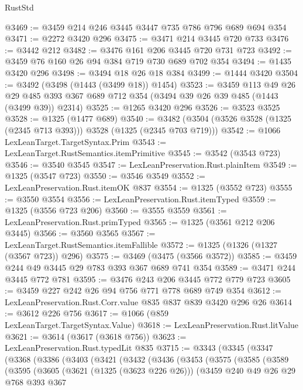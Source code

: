 \begin{lexlean}{RustStd}
\begin{coremodule}
@3469 := @3459 @214 @246 @3445 @3447 @735 @786 @796 @689 @694 @354
@3471 := @2272 @3420 @296
@3475 := @3471 @214 @3445 @720 @733
@3476 := @3442 @212
@3482 := @3476 @161 @206 @3445 @720 @731 @723
@3492 := @3459 @76 @160 @26 @94 @384 @719 @730 @689 @702 @354
@3494 := @1435 @3420 @296
@3498 := @3494 @18 @26 @18 @384
@3499 := @1444 @3420
@3504 := @3492 (@3498 (@1443 (@3499 @18)) @1454)
@3523 := @3459
    @113
    @49
    @26
    @29
    @485
    @393
    @367
    @689
    @712
    @354
    (@3494 @39 @26 @39 @485 (@1443 (@3499 @39)) @2314)
@3525 := @1265 @3420 @296
@3526 := @3523 @3525
@3528 := @1325 (@1477 @689)
@3540 := @3482 (@3504 (@3526 @3528 (@1325 (@2345 @713 @393))) @3528 (@1325 (@2345 @703 @719)))
@3542 := @1066 LexLeanTarget.TargetSyntax.Prim
@3543 := LexLeanTarget.RustSemantics.itemPrimitive
@3545 := @3542 (@3543 @723)
@3546 := @3540 @3545
@3547 := LexLeanPreservation.Rust.plainItem
@3549 := @1325 (@3547 @723)
@3550 := @3546 @3549
@3552 := LexLeanPreservation.Rust.itemOK @837
@3554 := @1325 (@3552 @723)
@3555 := @3550 @3554
@3556 := LexLeanPreservation.Rust.itemTyped
@3559 := @1325 (@3556 @723 @206)
@3560 := @3555 @3559
@3561 := LexLeanPreservation.Rust.primTyped
@3565 := @1325 (@3561 @212 @206 @3445)
@3566 := @3560 @3565
@3567 := LexLeanTarget.RustSemantics.itemFallible
@3572 := @1325 (@1326 (@1327 (@3567 @723)) @296)
@3575 := @3469 (@3475 (@3566 @3572))
@3585 := @3459 @244 @49 @3445 @29 @783 @393 @367 @689 @741 @354
@3589 := @3471 @244 @3445 @772 @781
@3595 := @3476 @243 @206 @3445 @772 @779 @723
@3605 := @3459 @227 @242 @26 @94 @756 @771 @778 @689 @749 @354
@3612 := LexLeanPreservation.Rust.Corr.value @835 @837 @839 @3420 @296 @26
@3614 := @3612 @226 @756
@3617 := @1066 (@859 LexLeanTarget.TargetSyntax.Value)
@3618 := LexLeanPreservation.Rust.litValue
@3621 := @3614 (@3617 (@3618 @756))
@3623 := LexLeanPreservation.Rust.typedLit @835
@3715 := @3343
    (@3345
      (@3347
        (@3368
          (@3386
            (@3403
              (@3421
                (@3432
                  (@3436
                    (@3453
                      (@3575
                        (@3585
                          (@3589
                            (@3595
                              (@3605
                                (@3621 (@1325 (@3623 @226 @26)))
                                (@3459
                                  @240
                                  @49
                                  @26
                                  @29
                                  @768
                                  @393
                                  @367

\end{coremodule}
\end{lexlean}
